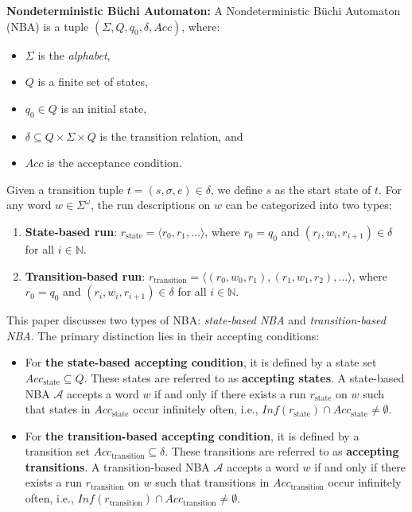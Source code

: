 \documentclass[acmlarge]{acmart}
\begin{document}
\textbf{Nondeterministic Büchi Automaton:} A Nondeterministic Büchi Automaton (NBA) is a tuple $(\Sigma, Q, q_0, \delta, Acc)$, where:
\begin{itemize}
  \item $\Sigma$ is the \emph{alphabet},
  \item $Q$ is a finite set of states,
  \item $q_0 \in Q$ is an initial state,
  \item $\delta \subseteq Q \times \Sigma \times Q$ is the transition relation, and
  \item $Acc$ is the acceptance condition.
\end{itemize}
Given a transition tuple $t = (s, \sigma, e) \in \delta$, we define $s$ as the start state of $t$. For any word $w \in \Sigma^{\omega}$, the run descriptions on $w$ can be categorized into two types:
\begin{enumerate}
    \item \textbf{State-based run}: $r_{\text{state}} = \langle r_0, r_1, \ldots \rangle$, where $r_0 = q_0$ and $(r_i, w_i, r_{i+1}) \in \delta$ for all $i \in \mathbb{N}$.
    
    \item \textbf{Transition-based run}: $r_{\text{transition}} = \langle (r_0, w_0, r_1), (r_1, w_1, r_2), \ldots \rangle$, where $r_0 = q_0$ and $(r_i, w_i, r_{i+1}) \in \delta$ for all $i \in \mathbb{N}$.
\end{enumerate}
This paper discusses two types of NBA: \emph{state-based NBA} and \emph{transition-based NBA}. The primary distinction lies in their accepting conditions:
\begin{itemize}
    \item For \textbf{the state-based accepting condition}, it is defined by a state set $\mathit{Acc}_{\text{state}} \subseteq Q$. These states are referred to as \textbf{accepting states}. A state-based NBA $\mathcal{A}$ accepts a word $w$ if and only if there exists a run $r_{\text{state}}$ on $w$ such that states in $\mathit{Acc}_{\text{state}}$ occur infinitely often, i.e., $\mathit{Inf}(r_{\text{state}}) \cap \mathit{Acc}_{\text{state}} \neq \emptyset$.
    
    \item For \textbf{the transition-based accepting condition}, it is defined by a transition set $\mathit{Acc}_{\text{transition}} \subseteq \delta$. These transitions are referred to as \textbf{accepting transitions}. A transition-based NBA $\mathcal{A}$ accepts a word $w$ if and only if there exists a run $r_{\text{transition}}$ on $w$ such that transitions in $\mathit{Acc}_{\text{transition}}$ occur infinitely often, i.e., $\mathit{Inf}(r_{\text{transition}}) \cap \mathit{Acc}_{\text{transition}} \neq \emptyset$.
\end{itemize}
\end{document}
